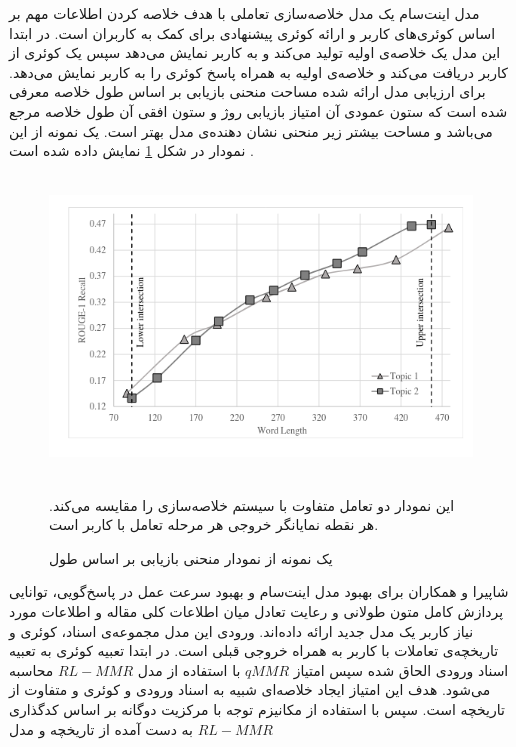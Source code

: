     مدل اینت‌سام
     یک مدل خلاصه‌سازی تعاملی با هدف خلاصه کردن اطلاعات مهم بر اساس کوئری‌های
  کاربر و ارائه کوئری پیشنهادی برای کمک به کاربران است. در ابتدا این مدل یک خلاصه‌ی اولیه تولید می‌‌کند و به کاربر نمایش می‌دهد سپس یک کوئری از کاربر دریافت می‌کند و خلاصه‌ی اولیه به همراه پاسخ کوئری را به کاربر نمایش می‌دهد.
  برای ارزیابی مدل ارائه شده مساحت منحنی بازیابی
   بر اساس طول خلاصه معرفی شده است که ستون عمودی آن امتیاز بازیابی روژ و ستون افقی آن طول خلاصه مرجع می‌باشد و مساحت بیشتر زیر منحنی نشان دهنده‌ی مدل بهتر است. یک نمونه از این نمودار در شکل \ref{fig:recall_curve}   نمایش داده شده است
     \cite{shapira-etal-2021-extending}.
     
     
     \begin{figure}[!h]
     	\begin{center}
     		\includegraphics[height=8cm]{recall cureve.png}
     	\end{center}
     	\caption{ یک نمونه از نمودار منحنی بازیابی بر اساس طول \cite{shapira-etal-2021-extending}}
     	\label{fig:recall_curve}
     	\small{این نمودار دو تعامل متفاوت با سیستم خلاصه‌سازی را مقایسه می‌کند. هر نقطه نمایانگر   خروجی هر مرحله تعامل با کاربر است.}
     	\medskip
     	
     \end{figure}
     
     
     
  
   شاپیرا و همکاران برای بهبود مدل اینت‌سام و بهبود سرعت عمل در پاسخ‌گویی، توانایی پردازش کامل متون طولانی و رعایت تعادل میان اطلاعات کلی مقاله و اطلاعات مورد نیاز کاربر یک مدل جدید ارائه داده‌‌اند.
 ورودی این مدل  مجموعه‌ی اسناد، کوئری و تاریخچه‌ی تعاملات با کاربر به همراه خروجی‌ قبلی است.
 در ابتدا تعبیه کوئری به تعبیه اسناد ورودی الحاق شده  سپس امتیاز $ qMMR $ با استفاده از مدل $ RL-MMR $ ‌محاسبه می‌شود. هدف این امتیاز  ایجاد خلاصه‌ای شبیه به اسناد ورودی و کوئری و متفاوت از تاریخچه است.
 سپس با استفاده از مکانیزم توجه با مرکزیت دوگانه
  بر اساس کدگذاری به دست آمده از تاریخچه و مدل $ RL-MMR $ ‌

